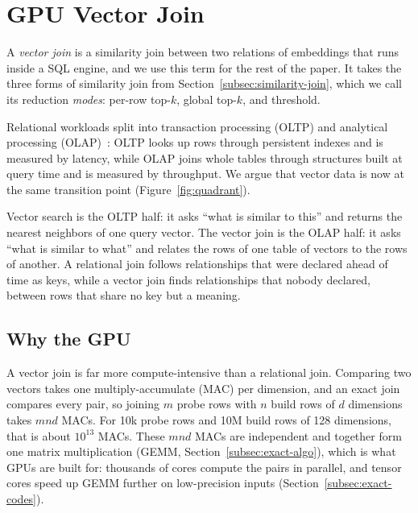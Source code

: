 \section{GPU Vector Join}\label{sec:gpu-vector-join}

A \emph{vector join} is a similarity join between two relations of embeddings that runs inside a SQL engine, and we use this term for the rest of the paper.
It takes the three forms of similarity join from Section~\ref{subsec:similarity-join}, which we call its reduction \emph{modes}: per-row top-$k$, global top-$k$, and threshold.



Relational workloads split into transaction processing (OLTP) and analytical processing (OLAP)~\cite{StonebrakerOneSize05, StonebrakerPavloAround24}: OLTP looks up rows through persistent indexes and is measured by latency, while OLAP joins whole tables through structures built at query time and is measured by throughput.
We argue that vector data is now at the same transition point (Figure~\ref{fig:quadrant}).

Vector search is the OLTP half: it asks ``what is similar to this'' and returns the nearest neighbors of one query vector.
The vector join is the OLAP half: it asks ``what is similar to what'' and relates the rows of one table of vectors to the rows of another.
A relational join follows relationships that were declared ahead of time as keys, while a vector join finds relationships that nobody declared, between rows that share no key but a meaning.

\subsection{Why the GPU}\label{subsec:why-gpu}

A vector join is far more compute-intensive than a relational join.
Comparing two vectors takes one multiply-accumulate (MAC) per dimension, and an exact join compares every pair, so joining $m$ probe rows with $n$ build rows of $d$ dimensions takes $mnd$ MACs.
For 10k probe rows and 10M build rows of 128 dimensions, that is about $10^{13}$ MACs.
These $mnd$ MACs are independent and together form one matrix multiplication (GEMM, Section~\ref{subsec:exact-algo}), which is what GPUs are built for: thousands of cores compute the pairs in parallel, and tensor cores speed up GEMM further on low-precision inputs (Section~\ref{subsec:exact-codes}).

